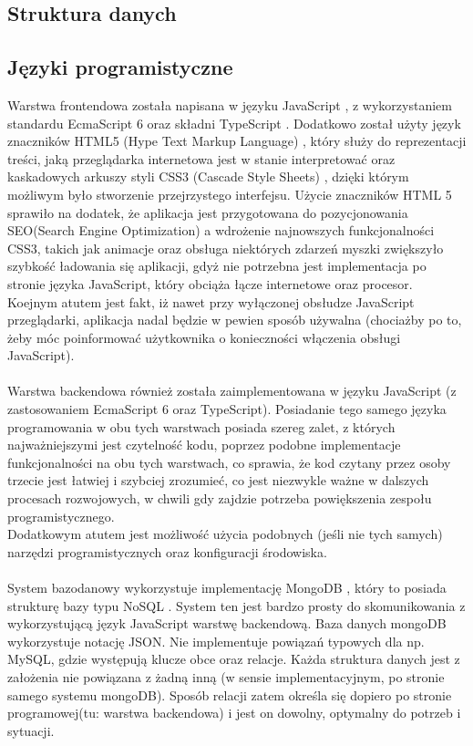 \documentclass[eng,printmode]{mgr}
\begin{document}
\subsection{Struktura danych}

\subsection{Języki programistyczne}
Warstwa frontendowa została napisana w języku JavaScript \cite {JS}, z wykorzystaniem standardu EcmaScript 6 \cite {ES6} oraz składni TypeScript \cite {TS}. Dodatkowo został użyty język znaczników HTML5 (Hype Text Markup Language) \cite {HTML}, który służy do reprezentacji treści, jaką przeglądarka internetowa jest w stanie interpretować oraz kaskadowych arkuszy styli CSS3 (Cascade Style Sheets) \cite {CSS}, dzięki którym możliwym było stworzenie przejrzystego interfejsu. Użycie znaczników HTML 5 sprawiło na dodatek, że aplikacja jest przygotowana do pozycjonowania SEO(Search Engine Optimization) \cite {HTML_SEO} a wdrożenie najnowszych funkcjonalności CSS3, takich jak animacje oraz obsługa niektórych zdarzeń myszki zwiększyło szybkość ładowania się aplikacji, gdyż nie potrzebna jest implementacja po stronie języka JavaScript, który obciąża łącze internetowe oraz procesor. Koejnym atutem jest fakt, iż nawet przy wyłączonej obsłudze JavaScript przeglądarki, aplikacja nadal będzie w pewien sposób używalna (chociażby po to, żeby móc poinformować użytkownika o konieczności włączenia obsługi JavaScript).
\\
\\
Warstwa backendowa również została zaimplementowana w języku JavaScript (z zastosowaniem EcmaScript 6 oraz TypeScript). Posiadanie tego samego języka programowania w obu tych warstwach posiada szereg zalet, z których najważniejszymi jest czytelność kodu, poprzez podobne implementacje funkcjonalności na obu tych warstwach, co sprawia, że kod czytany przez osoby trzecie jest łatwiej i szybciej zrozumieć, co jest niezwykle ważne w dalszych procesach rozwojowych, w chwili gdy zajdzie potrzeba powiększenia zespołu programistycznego.
\\
Dodatkowym atutem jest możliwość użycia podobnych (jeśli nie tych samych) narzędzi programistycznych oraz konfiguracji środowiska.
\\
\\
System bazodanowy wykorzystuje implementację MongoDB \cite{MongoDB}, który to posiada strukturę bazy typu NoSQL \cite{NO_SQL}. System ten jest bardzo prosty do skomunikowania z wykorzystującą język JavaScript warstwę backendową. Baza danych mongoDB wykorzystuje notację JSON. Nie implementuje powiązań typowych dla np. MySQL, gdzie występują klucze obce oraz relacje. Każda struktura danych jest z założenia nie powiązana z żadną inną (w sensie implementacyjnym, po stronie samego systemu mongoDB). Sposób relacji zatem określa się dopiero po stronie programowej(tu: warstwa backendowa) i jest on dowolny, optymalny do potrzeb i sytuacji.
\end{document}
